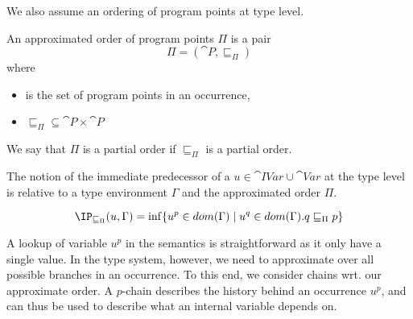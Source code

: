 \documentclass{llncs}
\newcommand{\uf}{\ensuremath{\mathsf{IP}}}
\newcommand{\sqleq}{\ensuremath{\sqsubseteq\xspace}}
\begin{document}
We also assume an ordering of program points at type level.

\begin{definition}
	An approximated order of program points $\Pi$ is a pair
	\[ \Pi=(\cat{P},\sqleq_\Pi) \]
	where
	\begin{itemize}
		\item {} is the set of program points in an occurrence,
		\item $\sqleq_\Pi\subseteq\cat{P}\times\cat{P}$
	\end{itemize}
	We say that $\Pi$ is a partial order if $\sqleq_\Pi$ is a partial order.
\end{definition}

The notion of the immediate predecessor of a $u\in\cat{IVar} \cup \cat{Var}$ at the type level is relative to a type environment $\Gamma$ and the approximated order $\Pi$.

\begin{definition}\label{def:GBindPi}
	\[ \IP_{\sqleq_\Pi}(u,\Gamma)=\inf\{u^p\in
          dom(\Gamma)\mid u^q\in dom(\Gamma).q\sqleq_\Pi p\} \]
\end{definition}

A lookup of variable $u^p$ in the semantics is straightforward as it only have a single value.
In the type system, however, we need to approximate over all possible branches in an occurrence.
To this end, we consider chains wrt. our approximate order. 
A $p$-chain describes the history behind an occurrence $u^p$, and can
thus be used to describe what an internal variable depends on. 


\end{document}
